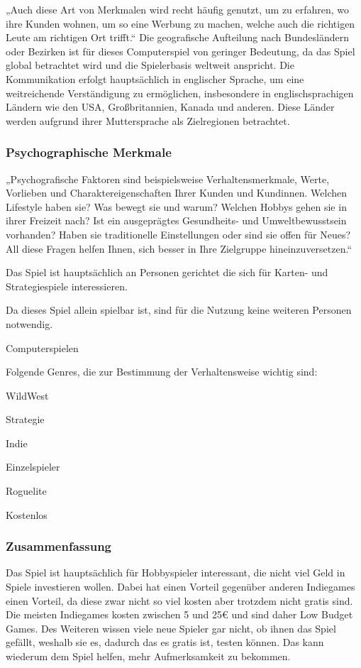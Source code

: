 „Auch diese Art von Merkmalen wird recht häufig genutzt, um zu erfahren, wo ihre Kunden wohnen, um so eine Werbung zu machen, welche auch die richtigen Leute am richtigen Ort trifft.“
Die geografische Aufteilung nach Bundesländern oder Bezirken ist für dieses Computerspiel von geringer Bedeutung, da das Spiel global betrachtet wird und die Spielerbasis weltweit anspricht.
Die Kommunikation erfolgt hauptsächlich in englischer Sprache, um eine weitreichende Verständigung zu ermöglichen, insbesondere in englischsprachigen Ländern wie den USA, Großbritannien, Kanada und anderen.
Diese Länder werden aufgrund ihrer Muttersprache als Zielregionen betrachtet.

\subsubsection{Psychographische Merkmale}\label{subsubsec:Psychographische-Merkmale}

„Psychografische Faktoren sind beispielsweise Verhaltensmerkmale, Werte, Vorlieben und Charaktereigenschaften Ihrer Kunden und Kundinnen. Welchen Lifestyle haben sie?
Was bewegt sie und warum? Welchen Hobbys gehen sie in ihrer Freizeit nach? Ist ein ausgeprägtes Gesundheits- und Umweltbewusstsein vorhanden? Haben sie traditionelle Einstellungen oder
sind sie offen für Neues? All diese Fragen helfen Ihnen, sich besser in Ihre Zielgruppe hineinzuversetzen.“ 

 Das Spiel ist hauptsächlich an Personen gerichtet die sich für Karten- und Strategiespiele interessieren.

 Da dieses Spiel allein spielbar ist, sind für die Nutzung keine weiteren Personen notwendig.

 Computerspielen

Folgende Genres, die zur Bestimmung der Verhaltensweise wichtig sind:
\begin{liste}
    \item WildWest
    \item Strategie
    \item Indie
    \item Einzelspieler
    \item Roguelite
    \item Kostenlos
\end{liste}


\subsubsection{Zusammenfassung}\label{subsubsec:Zusammenfassung}
Das Spiel ist hauptsächlich für Hobbyspieler interessant, die nicht viel Geld in Spiele investieren wollen. Dabei hat \ff einen Vorteil gegenüber anderen Indiegames einen Vorteil,
da diese zwar nicht so viel kosten aber trotzdem nicht gratis sind. Die meisten Indiegames kosten zwischen 5 und 25€ und sind daher Low Budget Games.\cite[.vgl]{IndiegamesPreis}
Des Weiteren wissen viele neue Spieler gar nicht, ob ihnen das Spiel gefällt, weshalb sie es, dadurch das es gratis ist, testen können. Das kann wiederum dem Spiel helfen, mehr Aufmerksamkeit zu bekommen.


\renewcommand{\kapitelautor}{}
